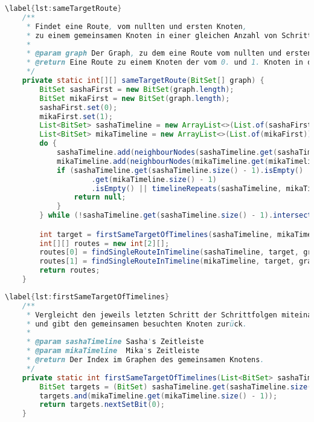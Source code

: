 \documentclass[a4paper,10pt,ngerman]{scrartcl}
\begin{document}
    \begin{lstlisting}[frame=single,language=Java,title=Methode sameTargetRoute,breaklines=true]
    \label{lst:sameTargetRoute}
    /**
     * Findet eine Route, vom nullten und ersten Knoten,
     * zu einem gemeinsamen Knoten in einer gleichen Anzahl von Schritten.
     *
     * @param graph Der Graph, zu dem eine Route vom nullten und ersten Knoten zu einem gemeinsamen Knoten gebildet werden soll.
     * @return Eine Route zu einem Knoten der vom 0. und 1. Knoten in der gleichen Anzahl von Schritten erreichbar ist.
     */
    private static int[][] sameTargetRoute(BitSet[] graph) {
        BitSet sashaFirst = new BitSet(graph.length);
        BitSet mikaFirst = new BitSet(graph.length);
        sashaFirst.set(0);
        mikaFirst.set(1);
        List<BitSet> sashaTimeline = new ArrayList<>(List.of(sashaFirst));
        List<BitSet> mikaTimeline = new ArrayList<>(List.of(mikaFirst));
        do {
            sashaTimeline.add(neighbourNodes(sashaTimeline.get(sashaTimeline.size() - 1), graph));
            mikaTimeline.add(neighbourNodes(mikaTimeline.get(mikaTimeline.size() - 1), graph));
            if (sashaTimeline.get(sashaTimeline.size() - 1).isEmpty() || mikaTimeline
                    .get(mikaTimeline.size() - 1)
                    .isEmpty() || timelineRepeats(sashaTimeline, mikaTimeline)) {
                return null;
            }
        } while (!sashaTimeline.get(sashaTimeline.size() - 1).intersects(mikaTimeline.get(mikaTimeline.size() - 1)));

        int target = firstSameTargetOfTimelines(sashaTimeline, mikaTimeline);
        int[][] routes = new int[2][];
        routes[0] = findSingleRouteInTimeline(sashaTimeline, target, graph);
        routes[1] = findSingleRouteInTimeline(mikaTimeline, target, graph);
        return routes;
    }
    \end{lstlisting}

\clearpage

    \begin{lstlisting}[frame=single,language=Java,title=Methode firstSameTargetOfTimelines,breaklines=true]
    \label{lst:firstSameTargetOfTimelines}
    /**
     * Vergleicht den jeweils letzten Schritt der Schrittfolgen miteinander
     * und gibt den gemeinsamen besuchten Knoten zurück.
     *
     * @param sashaTimeline Sasha's Zeitleiste
     * @param mikaTimeline  Mika's Zeitleiste
     * @return Der Index im Graphen des gemeinsamen Knotens.
     */
    private static int firstSameTargetOfTimelines(List<BitSet> sashaTimeline, List<BitSet> mikaTimeline) {
        BitSet targets = (BitSet) sashaTimeline.get(sashaTimeline.size() - 1).clone();
        targets.and(mikaTimeline.get(mikaTimeline.size() - 1));
        return targets.nextSetBit(0);
    }
    \end{lstlisting}
\end{document}
